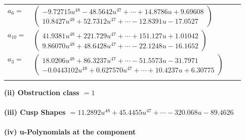 \documentclass[1p]{elsarticle_modified}
\theoremstyle{definition}
\begin{document}
\begin{tabular}{m{7pt} m{180pt} m{7pt} m{180pt} }
\flushright $a_{6}=$&$\begin{pmatrix}-9.72715 u^{48}-48.5642 u^{47}+\cdots+14.8786 u+9.69608\\10.8427 u^{48}+52.7312 u^{47}+\cdots-12.8391 u-17.0527\end{pmatrix}$ \\
\flushright $a_{10}=$&$\begin{pmatrix}41.9381 u^{48}+221.729 u^{47}+\cdots+151.127 u+1.01042\\9.86070 u^{48}+48.6428 u^{47}+\cdots-22.1248 u-16.1652\end{pmatrix}$ \\
\flushright $a_{3}=$&$\begin{pmatrix}18.0206 u^{48}+86.3237 u^{47}+\cdots-51.5573 u-31.7971\\-0.0443102 u^{48}+0.627570 u^{47}+\cdots+10.4237 u+6.30775\end{pmatrix}$\\&\end{tabular}
\flushleft \textbf{(ii) Obstruction class $= 1$}\\~\\
\flushleft \textbf{(iii) Cusp Shapes $= 11.2892 u^{48}+45.4455 u^{47}+\cdots-320.068 u-89.4626$}\\~\\
\newpage\renewcommand{\arraystretch}{1}
\flushleft \textbf{(iv) u-Polynomials at the component}\newline \\
\end{document}
